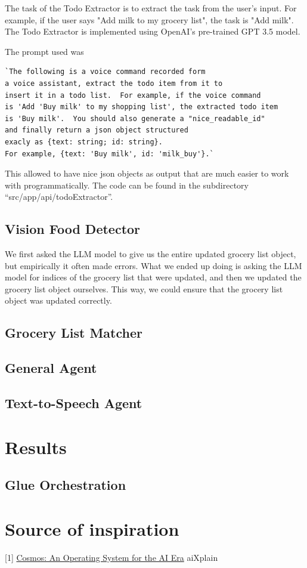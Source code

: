 \documentclass{article}
\begin{document}
The task of the Todo Extractor is to extract the task from the user's input. For example, if the user says "Add milk to my grocery list", the task is "Add milk". The Todo Extractor is implemented using OpenAI's pre-trained GPT 3.5 model.

The prompt used was
\begin{verbatim}
`The following is a voice command recorded form
a voice assistant, extract the todo item from it to
insert it in a todo list.  For example, if the voice command
is 'Add 'Buy milk' to my shopping list', the extracted todo item
is 'Buy milk'.  You should also generate a "nice_readable_id"
and finally return a json object structured
exacly as {text: string; id: string}.
For example, {text: 'Buy milk', id: 'milk_buy'}.`
\end{verbatim}

This allowed to have nice json objects as output that are much easier to work with programmatically. The code can be found in the subdirectory ``src/app/api/todoExtractor''.

\subsection*{\color{draculayellow}Vision Food Detector}

We first asked the LLM model to give us the entire updated grocery list object, but empirically it often made errors. What we ended up doing is asking the LLM model for indices of the grocery list that were updated, and then we updated the grocery list object ourselves. This way, we could ensure that the grocery list object was updated correctly.

\subsection*{\color{draculayellow}Grocery List Matcher}

\subsection*{\color{draculayellow}General Agent}

\subsection*{\color{draculayellow}Text-to-Speech Agent}

\section*{\color{draculagreen}Results}

\subsection*{\color{draculagreen}Glue Orchestration}

\section*{\color{draculagreen}Source of inspiration}

[1] \href{https://humane.com/media/cosmos-an-operating-system-for-the-ai-era}{Cosmos: An Operating System for the AI Era} \newline
[2] aiXplain
\end{document}
